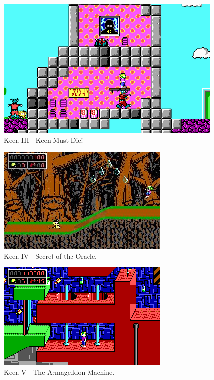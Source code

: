 \documentclass[book.tex]{subfiles}
\begin{document}
\begin{figure}[H]
  \centering
  \includegraphics[width=.95\textwidth]{screenshots_300dpi/keen1_3.png}
  \caption*{Keen III - Keen Must Die!}
\label{fig:keen_1}
\end{figure}




\begin{figure}[H]
  \centering
  \includegraphics[width=.95\textwidth]{screenshots_300dpi/keen2_1.jpg}
  \caption{Keen IV - Secret of the Oracle.}
\label{fig:keen_1}
\end{figure}

\begin{figure}[H]
  \centering
  \includegraphics[width=.95\textwidth]{screenshots_300dpi/keen2_2.png}
  \caption{Keen V - The Armageddon Machine.}
\label{fig:keen_1}
\end{figure}
\end{document}
